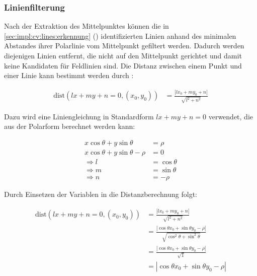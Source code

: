 \subsubsection{Linienfilterung}
\label{sec:impl:cv:lines:filter}

Nach der Extraktion des Mittelpunktes können die in \autoref{sec:impl:cv:lines:erkennung} () identifizierten Linien anhand des minimalen Abstandes ihrer Polarlinie vom Mittelpunkt gefiltert werden. Dadurch werden diejenigen Linien entfernt, die nicht auf den Mittelpunkt gerichtet und damit keine Kandidaten für Feldlinien sind. Die Distanz zwischen einem Punkt und einer Linie kann bestimmt werden durch \cite{point_line_distance}:

\begin{align*}
    \text{dist}(lx + my + n = 0, (x_0, y_0)) & = \frac{| l x_0 + m y_0 + n|}{\sqrt{l^2+n^2}}
\end{align*}

Dazu wird eine Liniengleichung in Standardform $ lx + my + n = 0 $ verwendet, die aus der Polarform berechnet werden kann:

\begin{align*}
    x \cos{\theta} + y \sin{\theta}        & = \rho         \\
    x \cos{\theta} + y \sin{\theta} - \rho & = 0            \\
    \Rightarrow l                          & = \cos{\theta} \\
    \Rightarrow m                          & = \sin{\theta} \\
    \Rightarrow n                          & = -\rho
\end{align*}

Durch Einsetzen der Variablen in die Distanzberechnung folgt:

\begin{align*}
    \text{dist}(lx + my + n = 0, (x_0, y_0)) & = \frac{| l x_0 + m y_0 + n|}{\sqrt{l^2+n^2}}                                                   \\
                                             & = \frac{| \cos{\theta} x_0 + \sin{\theta} y_0 - \rho |}{\sqrt{\cos^2{\theta} + \sin^2{\theta}}} \\
                                             & = \frac{| \cos{\theta} x_0 + \sin{\theta} y_0 - \rho |}{\sqrt{1}}                               \\
                                             & = | \cos{\theta} x_0 + \sin{\theta} y_0 - \rho |                                                \\
\end{align*}

